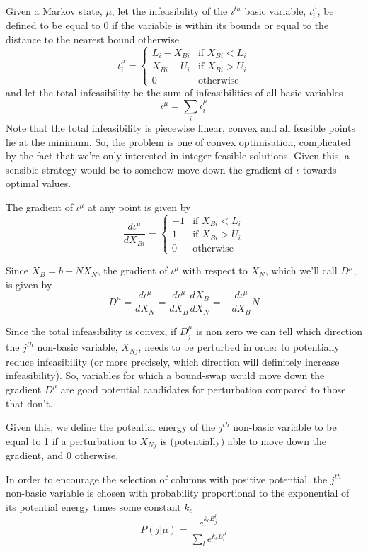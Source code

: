\documentclass{article}
\begin{document}
Given a Markov state, $\mu$, let the infeasibility of the $i^{th}$ basic variable, $\iota^\mu_i$, be defined to be equal to 0 if the variable is within its bounds or equal to the distance to the nearest bound otherwise
\[
\iota^\mu_i =
\begin{cases}
L_i-X_{Bi} & \text{if }X_{Bi}<L_i\\
X_{Bi}-U_i & \text{if }X_{Bi}>U_i\\
0 & \text{otherwise}
\end{cases}
\]
and let the total infeasibility be the sum of infeasibilities of all basic variables
\[
\iota^\mu = \sum_i \iota^\mu_i
\]
Note that the total infeasibility is piecewise linear, convex and all feasible points lie at the minimum. So, the problem is one of convex optimisation, complicated by the fact that we're only interested in integer feasible solutions. Given this,  a sensible strategy would be to somehow move down the gradient of $\iota$ towards optimal values.

The gradient of $\iota^\mu$ at any point is given by
\[
\frac{d\iota^\mu}{dX_{Bi}} = 
\begin{cases}
-1 & \text{if }X_{Bi}<L_i\\
1 & \text{if }X_{Bi}>U_i\\
0 & \text{otherwise}
\end{cases}
\]

Since $X_B = b - NX_N$, the gradient of $\iota^\mu$ with respect to $X_N$, which we'll call $D^\mu$, is given by
\[
D^\mu = \frac{d\iota^\mu}{dX_N} = \frac{d\iota^\mu}{dX_B}\frac{dX_B}{dX_N} = - \frac{d\iota^\mu}{dX_B}N
\]

Since the total infeasibility is convex, if $D^\mu_j$ is non zero we can tell which direction the $j^{th}$ non-basic variable, $X_{Nj}$, needs to be perturbed in order to potentially reduce infeasibility (or more precisely, which direction will definitely increase infeasibility). So, variables for which a bound-swap would move down the gradient $D^\mu$ are good potential candidates for perturbation compared to those that don't.

Given this, we define the potential energy of the $j^{th}$ non-basic variable to be equal to 1 if a perturbation to $X_{Nj}$ is (potentially) able to move down the gradient, and 0 otherwise.

In order to encourage the selection of columns with positive potential, the $j^{th}$ non-basic variable is chosen with probability proportional to the exponential of its potential energy times some constant $k_c$
\begin{equation}
P(j|\mu) = \frac{e^{k_cE^\mu_j}}{\sum_l e^{k_cE^\mu_l}}
\label{columnChoice}
\end{equation}
\end{document}
